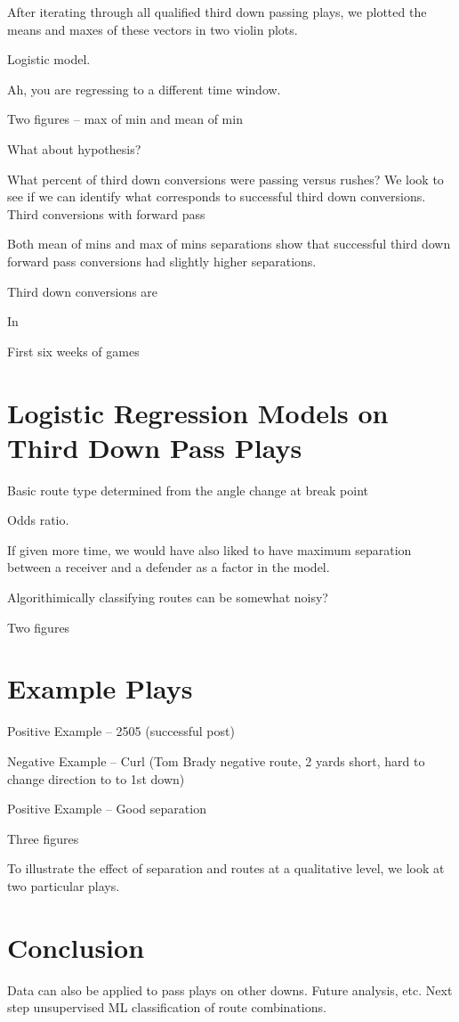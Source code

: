 \documentclass[12pt,letterpaper]{article}
\begin{document}
After iterating through all qualified third down passing plays, we plotted the means and maxes of these vectors in two violin plots.

Logistic model.

Ah, you are regressing to a different time window.

Two figures -- max of min and mean of min

What about hypothesis?

What percent of third down conversions were passing versus rushes? We look to see if we can identify what corresponds to successful third down conversions. Third conversions with forward pass

Both mean of mins and max of mins separations show that successful third down forward pass conversions had slightly higher separations.

Third down conversions are 

In

First six weeks of games

\section*{Logistic Regression Models on Third Down Pass Plays}

Basic route type determined from the angle change at break point

Odds ratio.

If given more time, we would have also liked to have maximum separation between a receiver and a defender as a factor in the model.

Algorithimically classifying routes can be somewhat noisy?

Two figures

\section*{Example Plays}

Positive Example -- 2505 (successful post)

Negative Example -- Curl (Tom Brady negative route, 2 yards short, hard to change direction to to 1st down)

Positive Example -- Good separation

Three figures

To illustrate the effect of separation and routes at a qualitative level, we look at two particular plays.

\section*{Conclusion}

Data can also be applied to pass plays on other downs. Future analysis, etc. Next step unsupervised ML classification of route combinations.
\end{document}

